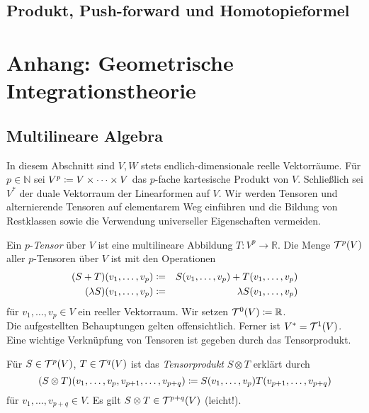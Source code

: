 \documentclass[a4paper,twoside,DIV15,BCOR12mm]{scrbook}
\begin{document}
\section{Produkt, Push-forward und Homotopieformel}









\chapter{Anhang: Geometrische Integrationstheorie}


\section{Multilineare Algebra}

In diesem Abschnitt sind $V, W$ stets endlich-dimensionale reelle Vektorräume. Für $p 
\in {\mathbb N}$ sei $V^{p} \da  V \times \dots \times V$ das $p$-fache 
kartesische Produkt von $V$. Schließlich sei $V^{*}$ der duale 
Vektorraum der Linearformen auf $V$. Wir werden Tensoren und 
alternierende Tensoren auf elementarem Weg einführen und die Bildung 
von Restklassen sowie die Verwendung universeller Eigenschaften 
vermeiden. 

\bigskip

 Ein $p$-{\em Tensor} über $V$ ist eine 
multilineare Abbildung $T: V^{p} \to {\mathbb R}$. Die Menge ${\cal 
T}^{p}(V)$ aller $p$-Tensoren über $V$ ist mit den Operationen 
\begin{eqnarray*}
(S + T)(v_{1},\dots,v_{p}) & \da  & S(v_{1},\dots,v_{p}) + 
T(v_{1},\dots,v_{p}) \\
(\lambda S)(v_{1},\dots,v_{p}) & \da  & \lambda S(v_{1},\dots,v_{p})
\end{eqnarray*}
für $v_{1},\dots,v_{p} \in V$ 
ein reeller Vektorraum. Wir setzen ${\cal T}^{0}(V) \da  {\mathbb R}$.\\

\noindent
Die aufgestellten Behauptungen gelten offensichtlich. Ferner ist 
$V^{*} = {\cal T}^{1}(V)$.\\

\noindent
Eine wichtige Verknüpfung von Tensoren ist gegeben durch das Tensorprodukt.

\bigskip

 Für $S \in {\cal T}^{p}(V)$, $T \in 
{\cal T}^{q}(V)$ ist das {\em Tensorprodukt} $S \otimes T$ erklärt durch
\[ (S \otimes T)(v_{1},\dots,v_{p},v_{p+1},\dots,v_{p+q}) \da  
S(v_{1},\dots,v_{p})T(v_{p+1},\dots,v_{p+q}) \]
für $v_{1},\dots,v_{p+q} \in V$. Es gilt $S \otimes T \in {\cal 
T}^{p+q}(V)$ (leicht!).
\end{document}
